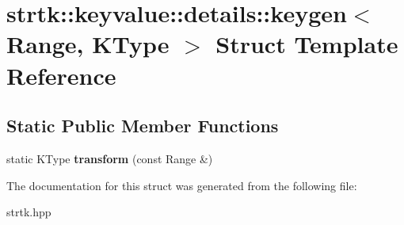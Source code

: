 \hypertarget{structstrtk_1_1keyvalue_1_1details_1_1keygen}{\section{strtk\-:\-:keyvalue\-:\-:details\-:\-:keygen$<$ Range, K\-Type $>$ Struct Template Reference}
\label{structstrtk_1_1keyvalue_1_1details_1_1keygen}
}
\subsection*{Static Public Member Functions}
\begin{DoxyCompactItemize}
\item 
\hypertarget{structstrtk_1_1keyvalue_1_1details_1_1keygen_a594c3190ac288845a8e4e3bbf3915635}{static K\-Type {\bfseries transform} (const Range \&)}\label{structstrtk_1_1keyvalue_1_1details_1_1keygen_a594c3190ac288845a8e4e3bbf3915635}

\end{DoxyCompactItemize}


The documentation for this struct was generated from the following file\-:\begin{DoxyCompactItemize}
\item 
strtk.\-hpp\end{DoxyCompactItemize}

